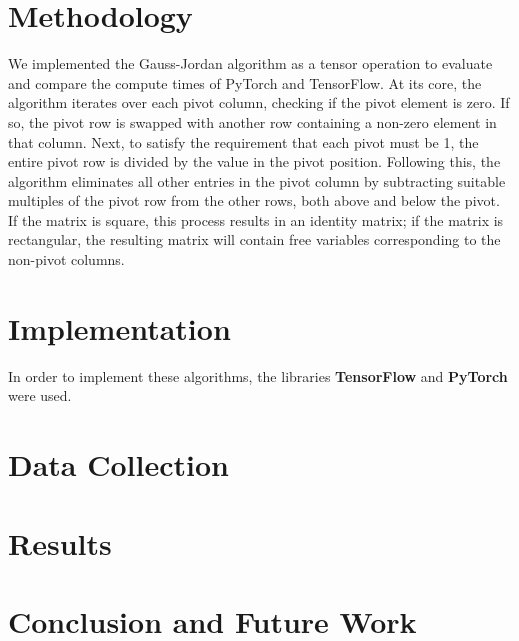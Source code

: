 \documentclass[12pt]{article}
\begin{document}
\section{Methodology}
We implemented the Gauss-Jordan algorithm as a tensor operation to evaluate and compare the compute times of PyTorch and TensorFlow. At its core, the algorithm iterates over each pivot column, checking if the pivot element is zero. If so, the pivot row is swapped with another row containing a non-zero element in that column. Next, to satisfy the requirement that each pivot must be 1, the entire pivot row is divided by the value in the pivot position. Following this, the algorithm eliminates all other entries in the pivot column by subtracting suitable multiples of the pivot row from the other rows, both above and below the pivot. If the matrix is square, this process results in an identity matrix; if the matrix is rectangular, the resulting matrix will contain free variables corresponding to the non-pivot columns.

\section{Implementation}

In order to implement these algorithms, the libraries \textbf{TensorFlow} and \textbf{PyTorch} were used.
\hfill\break

\lstset{style=mystyle}


\section{Data Collection}

\section{Results}

\section{Conclusion and Future Work}

\newpage


\end{document}
